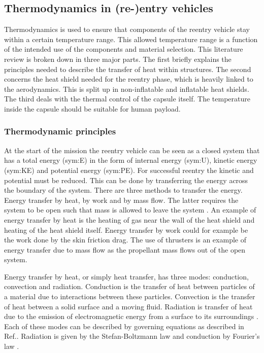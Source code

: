 \subsection{Thermodynamics in (re-)entry vehicles}\label{sec:thermo}
Thermodynamics is used to ensure that components of the reentry vehicle stay within a certain temperature range. This allowed temperature range is a function of the intended use of the components and material selection. This literature review is broken down in three major parts. The first briefly explains the principles needed to describe the transfer of heat within structures. The second concerns the heat shield needed for the reentry phase, which is heavily linked to the aerodynamics. This is split up in non-inflatable and inflatable heat shields. The third deals with the thermal control of the capsule itself. The temperature inside the capsule should be suitable for human payload.

\subsubsection{Thermodynamic principles}
At the start of the mission the reentry vehicle can be seen as a closed system that has a total energy (\gls{sym:E}) in the form of internal energy (\gls{sym:U}), kinetic energy (\gls{sym:KE}) and potential energy (\gls{sym:PE}). For successful reentry the kinetic and potential must be reduced. This can be done by transferring the energy across the boundary of the system. There are three methods to transfer the energy. Energy transfer by heat, by work and by mass flow. The latter requires the system to be open such that mass is allowed to leave the system \cite{Cengel2010}. An example of energy transfer by heat is the heating of gas near the wall of the heat shield and heating of the heat shield itself. Energy transfer by work could for example be the work done by the skin friction drag. The use of thrusters is an example of energy transfer due to mass flow as the propellant mass flows out of the open system. 

Energy transfer by heat, or simply heat transfer, has three modes: conduction, convection and radiation. Conduction is the transfer of heat between particles of a material due to interactions between these particles. Convection is the transfer of heat between a solid surface and a moving fluid. Radiation is transfer of heat due to the emission of electromagnetic energy from a surface to its surroundings \cite{Cengel2010, Karam1998}. Each of these modes can be described by governing equations as described in Ref.\cite{Holman2002}. Radiation is given by the Stefan-Boltzmann law and conduction by Fourier's law \cite{Cengel2010, Holman2002}.

